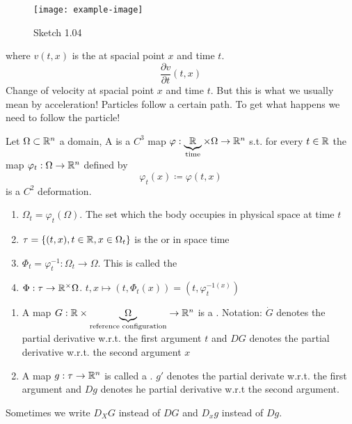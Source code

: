 
\begin{figure}[H]\label{fig:1.04}
    \centering
    \texttt{[image: example-image]}
    \caption{Sketch 1.04}
\end{figure}
where \(v(t,x)\) is the  at spacial point \(x\) and time \(t\).
\[\frac{\partial v}{\partial t}(t,x)\]
Change of velocity at spacial point \(x\) and time \(t\). But this is  what we usually mean by acceleration!
Particles follow a certain path. To get what happens we need to follow the particle!

\begin{definition}\label{def:1.12}
    Let \(\Omega\subset\mathbb{R}^n\) a domain, A  is a \(C^3\) map \(\varphi:\underbrace{\mathbb{R}}_{\text{time}}\times \Omega\to\mathbb{R}^n\) s.t. 
    for every \(t\in\mathbb{R}\) the map \(\varphi_t:\Omega\to\mathbb{R}^n\) defined by \[\varphi_t(x)\coloneqq \varphi(t,x)\]
    is a \(C^2\) deformation.

    \begin{enumerate}
        \item \(\Omega_t=\varphi_t(\Omega)\). The set which the body occupies in physical space at time \(t\)
        \item \(\tau=\{(t,x),t\in \mathbb{R},x\in\Omega_t\}\) is the  or  in space time %
        \item \(\Phi_t=\varphi_t^{-1}:\Omega_t\to\Omega\). This is called the 
        \item \(\Phi:\tau\to\mathbb{R}^\times\Omega\). \(t,x\mapsto (t,\Phi_t(x))=(t,\varphi_t^{-1(x)})\)
    \end{enumerate}

\end{definition}

\begin{definition}\label{def:1.13}
    \begin{enumerate}
        \item A map \(G:\mathbb{R} \times \underbrace{\Omega}_{\text{reference configuration}}\to\mathbb{R}^n\) is a . Notation:
        \(\dot{G}\) denotes the partial derivative w.r.t. the first argument \(t\) and \(DG\) denotes the partial derivative w.r.t. the second argument \(x\)
        \item A map \(g:\tau\to\mathbb{R}^n\) is called a . \(g'\) denotes the partial derivate w.r.t. the first argument and \(Dg\) denotes he partial derivative w.r.t the second argument.
    \end{enumerate}
    Sometimes we write \(D_XG\) instead of \(DG\) and \(D_xg\) instead of \(Dg\).
\end{definition}

